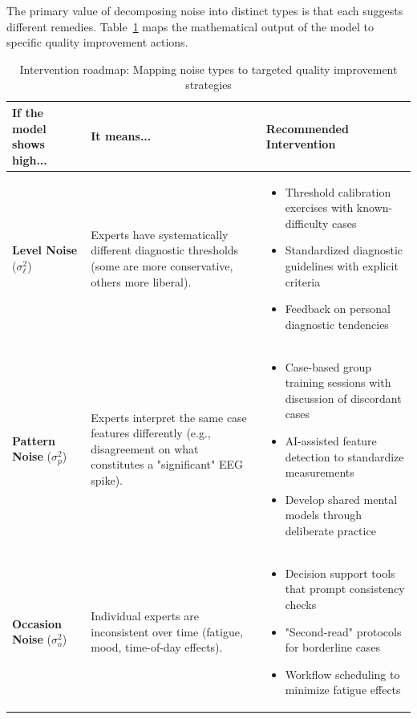 The primary value of decomposing noise into distinct types is that each suggests different remedies. Table~\ref{tab:intervention-roadmap} maps the mathematical output of the model to specific quality improvement actions.

\begin{table}[h]
\centering
\caption{Intervention roadmap: Mapping noise types to targeted quality improvement strategies}
\label{tab:intervention-roadmap}
\begin{tabular}{@{}p{}p{}p{}@{}}
\toprule
\textbf{If the model shows high...} & \textbf{It means...} & \textbf{Recommended Intervention} \\
\midrule
\textbf{Level Noise} ($\sigma_\ell^2$) &
Experts have systematically different diagnostic thresholds (some are more conservative, others more liberal). &
\begin{itemize}[leftmargin=*, nosep]
    \item Threshold calibration exercises with known-difficulty cases
    \item Standardized diagnostic guidelines with explicit criteria
    \item Feedback on personal diagnostic tendencies
\end{itemize} \\
\midrule
\textbf{Pattern Noise} ($\sigma_p^2$) &
Experts interpret the same case features differently (e.g., disagreement on what constitutes a "significant" EEG spike). &
\begin{itemize}[leftmargin=*, nosep]
    \item Case-based group training sessions with discussion of discordant cases
    \item AI-assisted feature detection to standardize measurements
    \item Develop shared mental models through deliberate practice
\end{itemize} \\
\midrule
\textbf{Occasion Noise} ($\sigma_o^2$) &
Individual experts are inconsistent over time (fatigue, mood, time-of-day effects). &
\begin{itemize}[leftmargin=*, nosep]
    \item Decision support tools that prompt consistency checks
    \item "Second-read" protocols for borderline cases
    \item Workflow scheduling to minimize fatigue effects
\end{itemize} \\
\bottomrule
\end{tabular}
\end{table}

